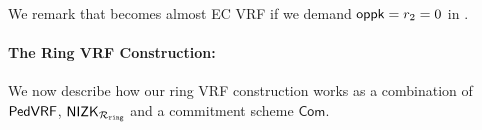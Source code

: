 %



We remark that \PedVRF becomes almost EC VRF if
we demand $\mathsf{oppk} = r_2 = 0$ in \Sign.

\paragraph{The Ring VRF Construction:} We now describe how our ring VRF construction works as a combination of $ {\mathsf{PedVRF}} $, $ {\mathsf{NIZK}}_{\mathcal{R}_{\mathtt{ring}}} $ and a commitment scheme $ \mathsf{Com} $.

